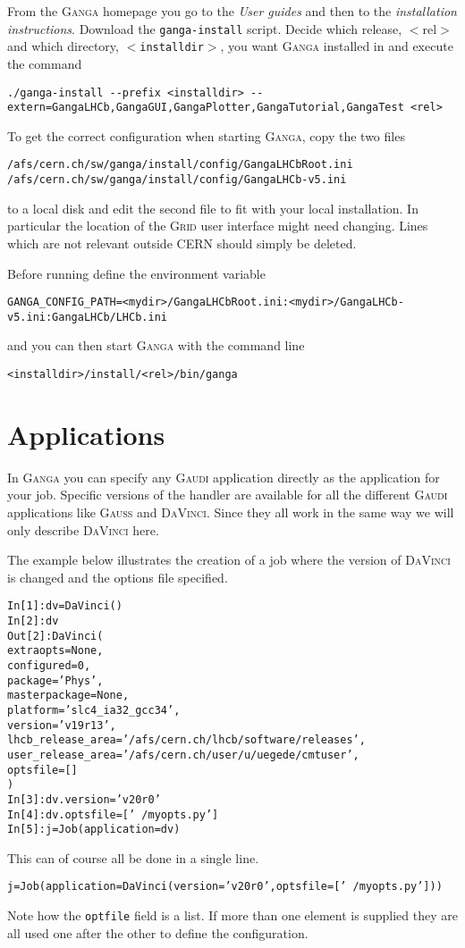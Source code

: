 \documentclass{howto}
\def\ganga {\textsc{Ganga}\xspace}
\def\gaudi {\textsc{Gaudi}\xspace}
\def\davinci {\textsc{DaVinci}\xspace}
\def\gauss {\textsc{Gauss}\xspace}
\def\grid {\textsc{Grid}\xspace}
\def\davinciv {v20r0\xspace}
\begin{document}
From the \ganga homepage you go to the \textit{User guides} and then to the
\textit{installation instructions}. Download the \texttt{ganga-install}
script. Decide which release, $<$rel$>$ and which directory,
\texttt{$<$installdir$>$}, you want \ganga installed in and execute the
command
\begin{verbatim}
./ganga-install --prefix <installdir> --extern=GangaLHCb,GangaGUI,GangaPlotter,GangaTutorial,GangaTest <rel>
\end{verbatim}

To get the correct configuration when starting \ganga, copy the two files
\begin{verbatim}
/afs/cern.ch/sw/ganga/install/config/GangaLHCbRoot.ini
/afs/cern.ch/sw/ganga/install/config/GangaLHCb-v5.ini
\end{verbatim}
to a local disk and edit the second file to fit with your local
installation. In particular the location of the \grid user interface might
need changing. Lines which are not relevant outside CERN should simply be
deleted.

Before running define the environment variable
\begin{verbatim}
GANGA_CONFIG_PATH=<mydir>/GangaLHCbRoot.ini:<mydir>/GangaLHCb-v5.ini:GangaLHCb/LHCb.ini
\end{verbatim}
and you can then start \ganga with the command line
\begin{verbatim}
<installdir>/install/<rel>/bin/ganga
\end{verbatim}

\section{Applications}
\label{sec:gaudi}
In \ganga you can specify any \gaudi application directly as the application
for your job. Specific versions of the handler are available for all the
different \gaudi applications like \gauss and \davinci. Since they all work
in the same way we will only describe \davinci here.

The example below illustrates the creation of a job where the version of
\davinci is changed and the options file specified.
\begin{alltt}
In [1]: dv = DaVinci()
In [2]: dv
Out[2]: DaVinci (
 extraopts = None ,
 configured = 0 ,
 package = 'Phys' ,
 masterpackage = None ,
 platform = 'slc4_ia32_gcc34' ,
 version = 'v19r13' ,
 lhcb_release_area = '/afs/cern.ch/lhcb/software/releases' ,
 user_release_area = '/afs/cern.ch/user/u/uegede/cmtuser' ,
 optsfile = []
 )
In [3]: dv.version='\davinciv'
In [4]: dv.optsfile=['~/myopts.py']
In [5]: j = Job(application=dv)
\end{alltt}
This can of course all be done in a single line.
\begin{alltt}
j = Job(application=DaVinci(version='\davinciv', optsfile=['~/myopts.py']))
\end{alltt}
Note how the \texttt{optfile} field is a list. If more than one element is
supplied they are all used one after the other to define the configuration.
\end{document}
